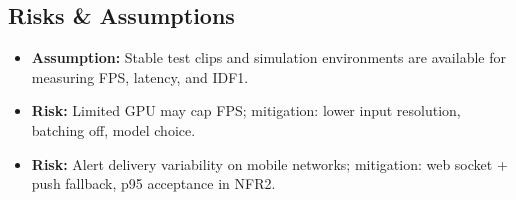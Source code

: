 \documentclass[12pt,a4paper]{report}
\begin{document}
\subsection*{Risks \& Assumptions}
\begin{itemize}[leftmargin=*]
\item \textbf{Assumption:} Stable test clips and simulation environments are available for measuring \ac{FPS}, latency, and \ac{IDF1}.
\item \textbf{Risk:} Limited \ac{GPU} may cap \ac{FPS}; mitigation: lower input resolution, batching off, model choice.
\item \textbf{Risk:} Alert delivery variability on mobile networks; mitigation: web socket + push fallback, p95 acceptance in NFR2.
\end{itemize}

\end{document}
